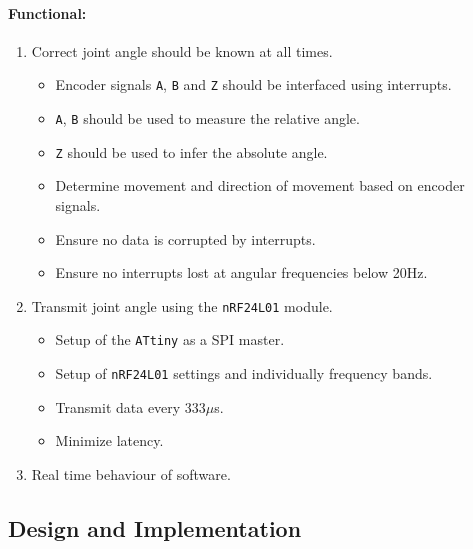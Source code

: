 \paragraph{Functional:}
\begin{enumerate}[resume]
	\item Correct joint angle should be known at all times.
	\label{enum:joint_correct_angles}
	\begin{itemize}
		\item Encoder signals \texttt{A}, \texttt{B} and \texttt{Z} should be interfaced using interrupts.
		\item \texttt{A}, \texttt{B} should be used to measure the relative angle.
		\item \texttt{Z} should be used to infer the absolute angle. 
		\item Determine movement and direction of movement based on encoder signals.
		\item Ensure no data is corrupted by interrupts.
		\item Ensure no interrupts lost at angular frequencies below 20Hz.
	\end{itemize}
	\item Transmit joint angle using the \texttt{nRF24L01} module.
	\label{enum:joint_transmit}
	\begin{itemize}
		\item Setup of the \texttt{ATtiny} as a SPI master.
		\item Setup of \texttt{nRF24L01} settings and individually frequency bands.
		\item Transmit data every 333$\mu$s.
		\item Minimize latency.
	\end{itemize}
	\item Real time behaviour of software.
	\label{enum:joint_real_time}
\end{enumerate}

\subsection{Design and Implementation} %
\label{sub:design_and_implementation}

